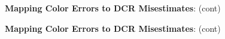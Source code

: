 \documentclass[DM,toc]{lsstdoc}
\begin{document}
\begin{figure}
    \ContinuedFloat
    \centering
    \caption[]{{\bf Mapping Color Errors to DCR Misestimates}: (cont)}
    \label{dcrerr2}
\end{figure}
\begin{figure}
    \ContinuedFloat
    \centering
    \caption[]{{\bf Mapping Color Errors to DCR Misestimates}: (cont)}
    \label{dcrerr2}
\end{figure}
\end{document}
